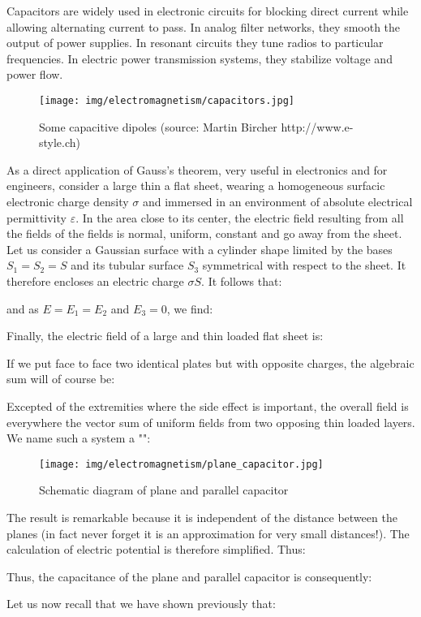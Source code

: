 	Capacitors are widely used in electronic circuits for blocking direct current while allowing alternating current to pass. In analog filter networks, they smooth the output of power supplies. In resonant circuits they tune radios to particular frequencies. In electric power transmission systems, they stabilize voltage and power flow.
	\begin{figure}[H]
		\centering
		\texttt{[image: img/electromagnetism/capacitors.jpg]}
		\caption{Some capacitive dipoles (source: Martin Bircher http://www.e-style.ch)}
	\end{figure}
	As a direct application of Gauss's theorem, very useful in electronics and for engineers, consider a large thin a flat sheet, wearing a homogeneous surfacic electronic charge density $\sigma$ and immersed in an environment of absolute electrical permittivity $\varepsilon$. In the area close to its center, the electric field resulting from all the fields of the fields is normal, uniform, constant and go away from the sheet. Let us consider a Gaussian surface with a cylinder shape limited by the bases $S_1=S_2=S$ and its tubular surface $S_3$ symmetrical with respect to the sheet. It therefore encloses an electric charge $\sigma S$. It follows that:
	
	and as $E=E_1=E_2$ and $E_3=0$, we find:
	
		Finally, the electric field of a large and thin loaded flat sheet is:
	
	If we put face to face two identical plates but with opposite charges, the algebraic sum will of course be:
	
	Excepted of the extremities where the side effect is important, the overall field is everywhere the vector sum of uniform fields from two opposing thin loaded layers. We name such a system a "":
	\begin{figure}[H]
		\centering
		\texttt{[image: img/electromagnetism/plane\_capacitor.jpg]}
		\caption{Schematic diagram of plane and parallel capacitor}
	\end{figure}
	The result is remarkable because it is independent of the distance between the planes (in fact never forget it is an approximation for very small distances!). The calculation of electric potential is therefore simplified. Thus:
	
	Thus, the capacitance of the plane and parallel capacitor is consequently:
	
	Let us now recall that we have shown previously that:
	
